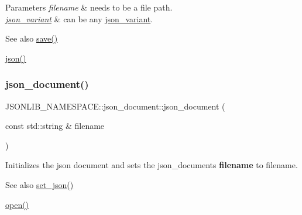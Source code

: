\begin{DoxyParams}{Parameters}
{\em filename} & needs to be a file path. \\
\hline
{\em \hyperlink{classJSONLIB__NAMESPACE_1_1json__variant}{json\+\_\+variant}} & can be any \hyperlink{classJSONLIB__NAMESPACE_1_1json__variant}{json\+\_\+variant}. \\
\hline
\end{DoxyParams}
\begin{DoxySeeAlso}{See also}
\hyperlink{classJSONLIB__NAMESPACE_1_1json__document_af8f392a0ffc779277ead1f2bdb222930}{save()} 

\hyperlink{classJSONLIB__NAMESPACE_1_1json__document_ad87b8e7d68ba854dbd730758273a3b93}{json()} 
\end{DoxySeeAlso}
\mbox{\label{classJSONLIB__NAMESPACE_1_1json__document_a3295c12f7251f1df5dc5f727a4e5b597}} 
\subsubsection{\texorpdfstring{json\+\_\+document()}{json\_document()}\hspace{0.1cm}{\footnotesize\ttfamily [2/3]}}
{\footnotesize\ttfamily J\+S\+O\+N\+L\+I\+B\+\_\+\+N\+A\+M\+E\+S\+P\+A\+C\+E\+::json\+\_\+document\+::json\+\_\+document (\begin{DoxyParamCaption}\item[{const std\+::string \&}]{filename }\end{DoxyParamCaption})}



Initializes the json document and sets the json\+\_\+documents {\bfseries filename} to {\ttfamily filename}. 

\begin{DoxySeeAlso}{See also}
\hyperlink{classJSONLIB__NAMESPACE_1_1json__document_a5a72e4dc0b37b95c70baefad930b5b71}{set\+\_\+json()} 

\hyperlink{classJSONLIB__NAMESPACE_1_1json__document_a08e509059e628742f35716dddce2d740}{open()} 
\end{DoxySeeAlso}
\mbox{\label{classJSONLIB__NAMESPACE_1_1json__document_acf256862749f93052ab0a5ad54272c3e}} 
